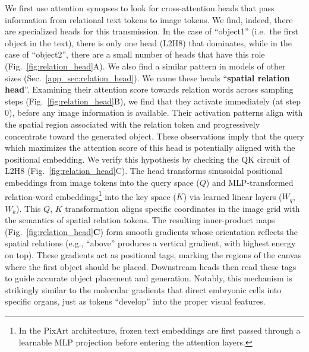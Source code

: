 We first use attention synopses to look for cross-attention heads that pass information from relational text tokens to image tokens. We find, indeed, there are specialized heads for this transmission. In the case of ``object1'' (i.e.\ the first object in the text), there is only one head (L2H8) that dominates, while in the case of ``object2'', there are a small number of heads that have this role (Fig.~\ref{fig:relation_head}A). We also find a similar pattern in models of other sizes (Sec.~\ref{app_sec:relation_head}).
We name these heads ``\textbf{spatial relation head}''. Examining their attention score towards relation words across sampling steps (Fig.~\ref{fig:relation_head}B), we find that they activate immediately (at step 0), before any image information is available. Their activation patterns align with the spatial region associated with the relation token and progressively concentrate toward the generated object. These observations imply that the query which maximizes the attention score of this head is potentially aligned with the positional embedding.
We verify this hypothesis by checking the QK circuit \cite{elhage2021mathematical} of L2H8 (Fig.~\ref{fig:relation_head}C). The head transforms sinusoidal positional embeddings from image tokens into the query space ($Q$) and MLP-transformed relation-word embeddings\footnote{In the PixArt architecture, frozen text embeddings are first passed through a learnable MLP projection before entering the attention layers.} into the key space ($K$) via learned linear layers ($W_q$, $W_k$).
This $Q$, $K$ transformation aligns specific coordinates in the image grid with the semantics of spatial relation tokens. The resulting inner-product maps (Fig.~\ref{fig:relation_head}\textbf{C}) form smooth gradients whose orientation reflects the spatial relations (e.g., ``above'' produces a vertical gradient, with highest energy on top). These gradients act as positional tags, marking the regions of the canvas where the first object should be placed. Downstream heads then read these tags to guide accurate object placement and generation. Notably, this mechanism is strikingly similar to the molecular gradients that direct embryonic cells into specific organs, just as tokens ``develop'' into the proper visual features.

